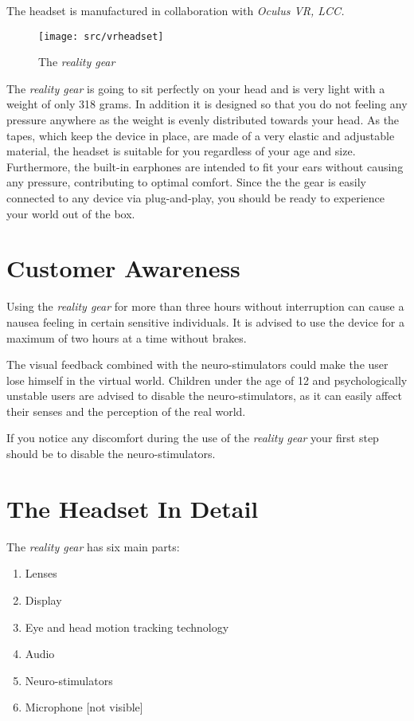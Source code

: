 The headset is manufactured in collaboration with \emph{Oculus VR, LCC.}

\begin{figure}[!ht]
\begin{center}
\texttt{[image: src/vrheadset]}
\end{center}
\caption[The \emph{\pokeT{} reality gear}]{The \emph{\poke{} reality gear}}
\label{headset}
\end{figure}

The \emph{\poke{} reality gear} is going to sit perfectly on your head and is very light with a weight of only 318 grams. In addition it is designed so that you do not feeling any pressure anywhere as the weight is evenly distributed towards your head. As the tapes, which keep the device in place, are made of a very elastic and adjustable material, the headset is suitable for you regardless of your age and size. Furthermore, the built-in earphones are  intended to fit your ears without causing any pressure, contributing to optimal comfort. Since the the gear is easily connected to any device via plug-and-play, you should be ready to experience your \poke{} world out of the box.

\section{Customer Awareness}

Using the \emph{\poke{} reality gear} for more than three hours without interruption can cause a nausea feeling in certain sensitive individuals. It is advised to use the device for a maximum of two hours at a time without brakes. 

The visual feedback combined with the neuro-stimulators could make the user lose himself in the virtual world. Children under the age of 12 and psychologically unstable users are advised to disable the neuro-stimulators, as it can easily affect their senses and the perception of the real world. 

If you notice any discomfort during the use of the \emph{\poke{} reality gear} your first step should be to disable the neuro-stimulators.

\newpage
\section{The Headset In Detail}

The \emph{\poke{} reality gear} has six main parts:
\begin{enumerate}
\setlength\itemsep{.05em}
\item Lenses
\item Display
\item Eye and head motion tracking technology
\item Audio
\item Neuro-stimulators 
\item Microphone [not visible]
\end{enumerate}

